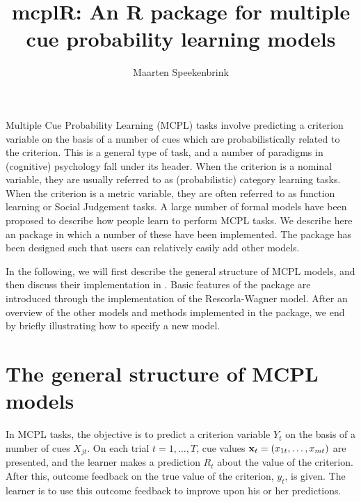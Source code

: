 \documentclass[doc]{apa}
\title{mcplR: An R package for multiple cue probability learning models}
\author{Maarten Speekenbrink}
\affiliation{Department of Cognitive, Perceptual and Brain Sciences \\ University College London}
\renewcommand{\vec}[1]{\text{\bf{#1}}}
\newcommand{\code}[1]{{\ttfamily{#1}}}
\begin{document}
\maketitle

Multiple Cue Probability Learning (MCPL) tasks involve predicting a criterion variable on the basis of a number of cues which are probabilistically related to the criterion. This is a general type of task, and a number of paradigms in (cognitive) psychology fall under its header. When the criterion is a nominal variable, they are usually referred to as (probabilistic) category learning tasks. When the criterion is a metric variable, they are often referred to as function learning or Social Judgement tasks. A large number of formal models have been proposed to describe how people learn to perform MCPL tasks. We describe here an \code{R} package in which a number of these have been implemented. The package has been designed such that users can relatively easily add other models. 

In the following, we will first describe the general structure of MCPL models, and then discuss their implementation in \code{mcplR}. Basic features of the package are introduced through the implementation of the Rescorla-Wagner model. After an overview of the other models and methods implemented in the package, we end by briefly illustrating how to specify a new model. 

\section{The general structure of MCPL models}

In MCPL tasks, the objective is to predict a criterion variable $Y_t$ on the basis of a number of cues $X_{jt}$. On each trial $t = 1,\ldots,T$, cue values $\vec{x}_t = (x_{1t},\ldots,x_{mt})$ are presented, and the learner makes a prediction $R_t$ about the value of the criterion. After this, outcome feedback on the true value of the criterion, $y_t$, is given. The learner is to use this outcome feedback to improve upon his or her predictions.
\end{document}
